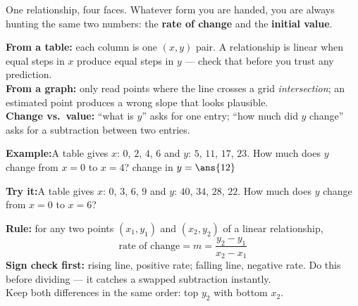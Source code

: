 \documentclass[12pt]{article}
\begin{document}

\noindent\small One relationship, four faces. Whatever form you are handed,
you are always hunting the same two numbers: the \textbf{rate of change} and
the \textbf{initial value}.\normalsize


\begin{formulabox}
\textbf{From a table:} each column is one $(x, y)$ pair. A relationship is
linear when equal steps in $x$ produce equal steps in $y$ --- check that
before you trust any prediction.\\[3pt]
\textbf{From a graph:} only read points where the line crosses a grid
\emph{intersection}; an estimated point produces a wrong slope that looks
plausible.\\[3pt]
\textbf{Change vs.\ value:} ``what is $y$'' asks for one entry; ``how much did
$y$ change'' asks for a subtraction between two entries.
\end{formulabox}

\begin{examplebox}
\textbf{Example:}\quad A table gives $x$: $0$, $2$, $4$, $6$ \; and
$y$: $5$, $11$, $17$, $23$. \; How much does $y$ change from $x = 0$ to
$x = 4$?
change in $y = \ans{12}$
\end{examplebox}

\begin{tryitbox}
\textbf{Try it:}\quad A table gives $x$: $0$, $3$, $6$, $9$ \; and
$y$: $40$, $34$, $28$, $22$. \; How much does $y$ change from $x = 0$ to
$x = 6$?\\[2pt]
\end{tryitbox}


\begin{formulabox}
\textbf{Rule:} for any two points $(x_1, y_1)$ and $(x_2, y_2)$ of a linear
relationship,
\[ \text{rate of change} = m = \frac{y_2 - y_1}{x_2 - x_1} \]
\textbf{Sign check first:} rising line, positive rate; falling line, negative
rate. Do this before dividing --- it catches a swapped subtraction instantly.\\[3pt]
Keep both differences in the same order: top $y_2$ with bottom $x_2$.
\end{formulabox}
\end{document}
